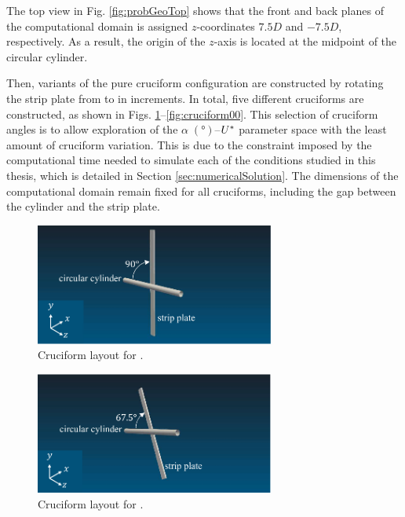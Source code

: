 \documentclass[oneside]{utmthesis}
\begin{document}
The top view in Fig. \ref{fig:probGeoTop} shows that the front and back planes of the computational domain is assigned $z$-coordinates $7.5D$ and $-7.5D$, respectively. As a result, the origin of the $z$-axis is located at the midpoint of the circular cylinder.

Then, variants of the pure cruciform configuration are constructed by rotating the strip plate from \angfi{} to \angon{} in \angtw{} increments. In total, five different cruciforms are constructed, as shown in Figs. \ref{fig:cruciform90}--\ref{fig:cruciform00}. This selection of cruciform angles is to allow exploration of the $\alpha \; (\si{\degree})$--$U^{*}$ parameter space with the least amount of cruciform variation. This is due to the constraint imposed by the computational time needed to simulate each of the conditions studied in this thesis, which is detailed in Section \ref{sec:numericalSolution}. The dimensions of the computational domain remain fixed for all cruciforms, including the gap between the cylinder and the strip plate.

\begin{figure}[!h]
  \centering
  \hspace{1cm} \includegraphics[width=0.7\textwidth]{figs/cruciform90}
  \caption{Cruciform layout for \angfi{}.}
  \label{fig:cruciform90}
\end{figure}

\begin{figure}[!h]
  \centering
  \hspace{1cm} \includegraphics[width=0.7\textwidth]{figs/cruciform675}
  \caption{Cruciform layout for \angfo{}.}
  \label{fig:cruciform675}
\end{figure}
\end{document}
